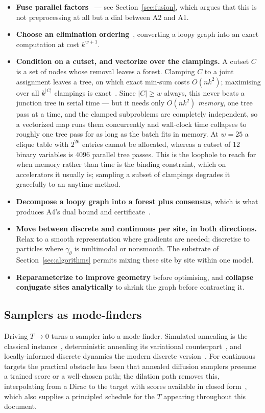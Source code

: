 \begin{itemize}
    \item \textbf{Fuse parallel factors}~\citep{Sennesh2023} --- see Section~\ref{sec:fusion}, which argues that this is not preprocessing at all but a dial between A2 and A1.
    \item \textbf{Choose an elimination ordering}~\citep{Dechter1999}, converting a loopy graph into an exact computation at cost $k^{w+1}$.
    \item \textbf{Condition on a cutset, and vectorize over the clampings.} A cutset $C$ is a set of nodes whose removal leaves a forest. Clamping $C$ to a joint assignment leaves a tree, on which exact min-sum costs $O(n k^2)$; maximising over all $k^{\lvert C \rvert}$ clampings is exact~\citep{Pearl1988}. Since $\lvert C \rvert \geq w$ always, this never beats a junction tree in serial time --- but it needs only $O(n k^2)$ \emph{memory}, one tree pass at a time, and the clamped subproblems are completely independent, so a vectorized map runs them concurrently and wall-clock time collapses to roughly one tree pass for as long as the batch fits in memory. At $w = 25$ a clique table with $2^{26}$ entries cannot be allocated, whereas a cutset of 12 binary variables is 4096 parallel tree passes. This is the loophole to reach for when memory rather than time is the binding constraint, which on accelerators it usually is; sampling a subset of clampings degrades it gracefully to an anytime method.
    \item \textbf{Decompose a loopy graph into a forest plus consensus}, which is what produces A4's dual bound and certificate~\citep{Wainwright2005}.
    \item \textbf{Move between discrete and continuous per site, in both directions.} Relax to a smooth representation where gradients are needed; discretise to particles where $\gamma_\theta$ is multimodal or nonsmooth. The substrate of Section~\ref{sec:algorithms} permits mixing these site by site within one model.
    \item \textbf{Reparameterize to improve geometry} before optimising, and \textbf{collapse conjugate sites analytically} to shrink the graph before contracting it.
\end{itemize}

\subsection{Samplers as mode-finders}

Driving $T \rightarrow 0$ turns a sampler into a mode-finder. Simulated annealing is the classical instance~\citep{Geman1984}, deterministic annealing its variational counterpart~\citep{Rose1998}, and locally-informed discrete dynamics the modern discrete version~\citep{Sun2023}. For continuous targets the practical obstacle has been that annealed diffusion samplers presume a trained score or a well-chosen path; the dilation path removes this, interpolating from a Dirac to the target with scores available in closed form~\citep{Chehab2024}, which also supplies a principled schedule for the $T$ appearing throughout this document.

